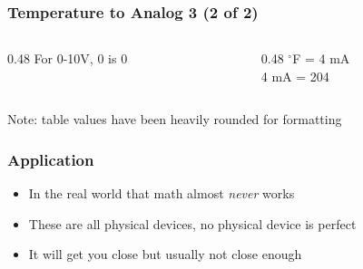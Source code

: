 \begin{frame}
    \frametitle{Temperature to Analog 3 (2 of 2)}

    \begin{columns}
        \begin{column}{0.48\linewidth}
            \centering
            For 0-10V, 0 is 0
        \end{column}
        \begin{column}{0.48\linewidth}
            $^\circ$F = 4 mA\\
            4 mA = 204
        \end{column}
    \end{columns}

    \vspace{1em}

    \begin{table}
        \centering
        {\scriptsize Note: table values have been heavily rounded for formatting\par}
    \end{table}  
\end{frame}

\begin{frame}
    \frametitle{Application}

    \begin{itemize}
        \item In the real world that math almost \emph{never} works
        \item These are all physical devices, no physical device is perfect
        \item It will get you close but usually not close enough
    \end{itemize}
\end{frame}

